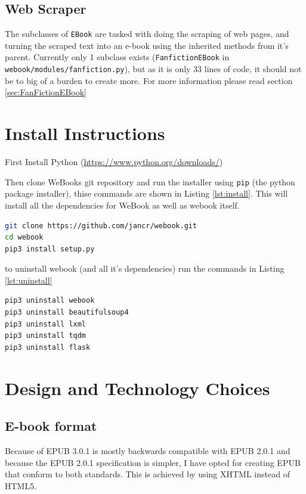 \documentclass[]{report}   %
\begin{document}
\subsection{Web Scraper}
The subclasses of \texttt{EBook} are tasked with doing the scraping of
web pages, and turning the scraped text into an e-book using the inherited
methods from it's parent. Currently only 1 subclass exists
(\texttt{FanfictionEBook} in \texttt{webook/modules/fanfiction.py}), but as it
is only 33 lines of code, it should not be to big of a burden to create more.
For more information please read section \ref{sec:FanFictionEBook}

\section{Install Instructions}
First Install Python (\url{https://www.python.org/downloads/})

Then clone WeBooks git repository and run the installer using \texttt{pip} (the
python package installer), thise commands are shown in Listing
\ref{lst:install}. This will install all the dependencies for WeBook as well as
webook itself. 

\begin{lstlisting}[language=bash, label={lst:install},
                   caption={WeBook install instructions}]
git clone https://github.com/jancr/webook.git
cd webook
pip3 install setup.py
\end{lstlisting}

to uninstall webook (and all it's dependencies) run the commands in Listing \ref{lst:uninstall}
\begin{lstlisting}[language=bash, label={lst:uninstall},
                   caption={WeBook uninstall instructions}]
pip3 uninstall webook
pip3 uninstall beautifulsoup4
pip3 uninstall lxml
pip3 uninstall tqdm
pip3 uninstall flask
\end{lstlisting}

\section{Design and Technology Choices}
\subsection{E-book format}
Because of EPUB 3.0.1 is mostly backwards compatible with EPUB
2.0.1\cite{epub2to3} and because the EPUB 2.0.1 specification is simpler, I have
opted for creating EPUB that conform to both standards. This is achieved by
using XHTML instead of HTML5.
\end{document}
